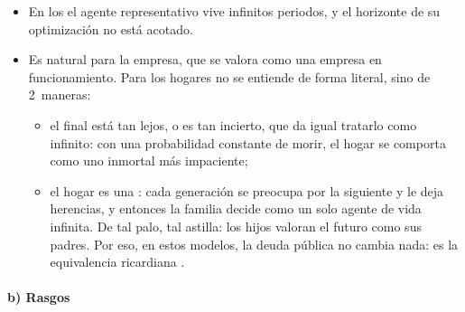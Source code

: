 \documentclass[11pt]{article}
\begin{document}
\begin{itemize}
\item En los  el agente representativo vive infinitos periodos, y el horizonte de su optimización no está acotado.
\item Es natural para la empresa, que se valora como una empresa en funcionamiento. Para los hogares no se entiende de forma literal, sino de 2~maneras:
  \begin{itemize}
  \item el final está tan lejos, o es tan incierto, que da igual tratarlo como infinito: con una probabilidad constante de morir, el hogar se comporta como uno inmortal más impaciente;
  \item el hogar es una : cada generación se preocupa por la siguiente y le deja herencias, y entonces la familia decide como un solo agente de vida infinita\nocite{Barro1974}. De tal palo, tal astilla: los hijos valoran el futuro como sus padres. Por eso, en estos modelos, la deuda pública no cambia nada: es la equivalencia ricardiana  .
  \end{itemize}
\end{itemize}

\paragraph{b) Rasgos}
\end{document}
